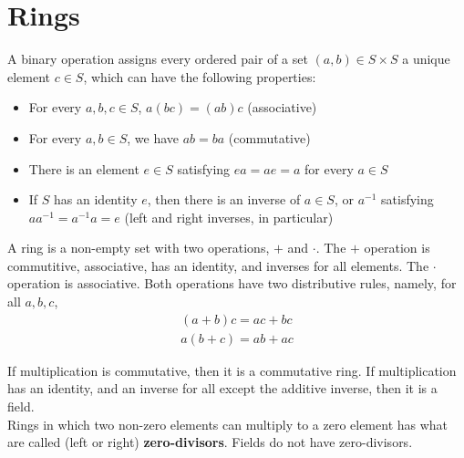 \documentclass{memoir}
\begin{document}
\chapter{Rings}
\label{cha:rings}
\begin{defn}
	A binary operation assigns every ordered pair of a set \((a,b)\in S\times S\) a unique element \(c \in S\), which can have the following properties:
	\begin{itemize}
		\item For every \(a,b,c \in S\), \(a(bc) = (ab)c\) (associative)
		\item For every \(a,b \in S\), we have \(ab = ba\) (commutative)
		\item There is an element \(e \in S\) satisfying \(ea  = ae = a\) for every \(a \in S\) 
		\item If \(S\) has an identity \(e\), then there is an inverse of \(a \in S\), or \(a^{-1}\) satisfying \(aa^{-1} = a^{-1}a = e\) (left and right inverses, in particular)
	\end{itemize}
\end{defn}
\begin{defn}[Rings]
	A ring is a non-empty set with two operations, \(+\) and \(\cdot \). The \(+\) operation is commutitive, associative, has an identity, and inverses for all elements. The \(\cdot \) operation is associative. Both operations have two distributive rules, namely, for all \(a,b,c\),
	\begin{align*}
		(a+b)c = ac + bc\\
		a(b+c) = ab+ac 
	\end{align*}
\end{defn}
If multiplication is commutative, then it is a commutative ring. If multiplication has an identity, and an inverse for all except the additive inverse, then it is a field.\\
Rings in which two non-zero elements can multiply to a zero element has what are called (left or right) \textbf{zero-divisors}. Fields do not have zero-divisors.
\end{document}
